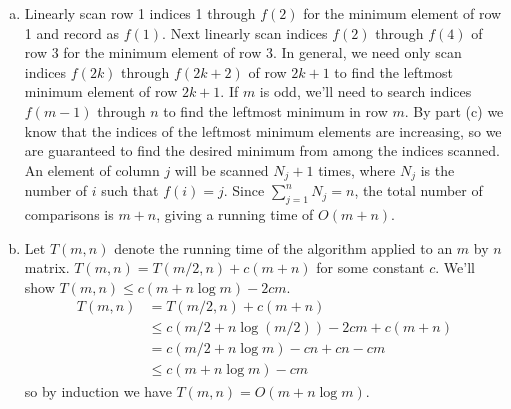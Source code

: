 \documentclass{article}
\begin{document}
\begin{enumerate}[a.]
\item Linearly scan row 1 indices 1 through $f(2)$ for the minimum element of row 1 and record as $f(1)$.  Next linearly scan indices $f(2)$ through $f(4)$ of row 3 for the minimum element of row 3.  In general, we need only scan indices $f(2k)$ through $f(2k+2)$ of row $2k+1$ to find the leftmost minimum element of row $2k+1$.  If $m$ is odd, we'll need to search indices $f(m-1)$ through $n$ to find the leftmost minimum in row $m$.  By part (c) we know that the indices of the leftmost minimum elements are increasing, so we are guaranteed to find the desired minimum from among the indices scanned. An element of column $j$ will be scanned $N_j + 1$ times, where $N_j$ is the number of $i$ such that $f(i) = j$. Since $\sum_{j=1}^n N_j= n$, the total number of comparisons is $m + n$, giving a running time of $O(m+n)$. \\

\item Let $T(m,n)$ denote the running time of the algorithm applied to an $m$ by $n$ matrix.  $T(m,n) = T(m/2,n) + c(m+n)$ for some constant $c$.  We'll show $T(m,n) \leq c(m + n\log m) - 2cm$.
\begin{align*}
T(m,n) &= T(m/2,n) + c(m+n)\\
&\leq c(m/2 + n\log(m/2)) - 2cm + c(m+n) \\
&= c(m/2 + n\log m) - cn + cn - cm \\
& \leq c(m+n\log m) - cm
\end{align*}
so by induction we have $T(m,n) = O(m+n\log m)$.
\end{enumerate}
\end{document}
